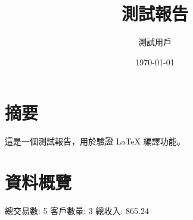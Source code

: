 \documentclass[UTF8]{ctexart}
\begin{document}
\title{測試報告}
\author{測試用戶}
\date{\today}
\maketitle
\section{摘要}
這是一個測試報告，用於驗證 LaTeX 編譯功能。
\section{資料概覽}
總交易數: 5
客戶數量: 3
總收入: 865.24
\end{document}
